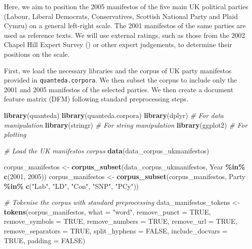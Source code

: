\documentclass[
]{book}
\newenvironment{Shaded}{\begin{snugshade}}{\end{snugshade}}
\newcommand{\AttributeTok}[1]{\textcolor[rgb]{0.13,0.29,0.53}{#1}}
\newcommand{\CommentTok}[1]{\textcolor[rgb]{0.56,0.35,0.01}{\textit{#1}}}
\newcommand{\ConstantTok}[1]{\textcolor[rgb]{0.56,0.35,0.01}{#1}}
\newcommand{\DecValTok}[1]{\textcolor[rgb]{0.00,0.00,0.81}{#1}}
\newcommand{\FunctionTok}[1]{\textcolor[rgb]{0.13,0.29,0.53}{\textbf{#1}}}
\newcommand{\NormalTok}[1]{#1}
\newcommand{\OtherTok}[1]{\textcolor[rgb]{0.56,0.35,0.01}{#1}}
\newcommand{\SpecialCharTok}[1]{\textcolor[rgb]{0.81,0.36,0.00}{\textbf{#1}}}
\newcommand{\StringTok}[1]{\textcolor[rgb]{0.31,0.60,0.02}{#1}}
\begin{document}
Here, we aim to position the 2005 manifestos of the five main UK political parties (Labour, Liberal Democrats, Conservatives, Scottish National Party and Plaid Cymru) on a general left-right scale. The 2001 manifestos of the same parties are used as reference texts. We will use external ratings, such as those from the 2002 Chapel Hill Expert Survey () or other expert judgements, to determine their positions on the scale.

First, we load the necessary libraries and the corpus of UK party manifestos provided in \texttt{quanteda.corpora}. We then subset the corpus to include only the 2001 and 2005 manifestos of the selected parties. We then create a document feature matrix (DFM) following standard preprocessing steps.

\begin{Shaded}
\begin{Highlighting}[]
\FunctionTok{library}\NormalTok{(quanteda)}
\FunctionTok{library}\NormalTok{(quanteda.corpora)}
\FunctionTok{library}\NormalTok{(dplyr)  }\CommentTok{\# For data manipulation}
\FunctionTok{library}\NormalTok{(stringr)  }\CommentTok{\# For string manipulation}
\FunctionTok{library}\NormalTok{(ggplot2)  }\CommentTok{\# For plotting}

\CommentTok{\# Load the UK manifestos corpus}
\FunctionTok{data}\NormalTok{(data\_corpus\_ukmanifestos)}

\NormalTok{corpus\_manifestos }\OtherTok{\textless{}{-}} \FunctionTok{corpus\_subset}\NormalTok{(data\_corpus\_ukmanifestos, Year }\SpecialCharTok{\%in\%} \FunctionTok{c}\NormalTok{(}\DecValTok{2001}\NormalTok{, }\DecValTok{2005}\NormalTok{))}
\NormalTok{corpus\_manifestos }\OtherTok{\textless{}{-}} \FunctionTok{corpus\_subset}\NormalTok{(corpus\_manifestos, Party }\SpecialCharTok{\%in\%} \FunctionTok{c}\NormalTok{(}\StringTok{"Lab"}\NormalTok{, }\StringTok{"LD"}\NormalTok{, }\StringTok{"Con"}\NormalTok{,}
    \StringTok{"SNP"}\NormalTok{, }\StringTok{"PCy"}\NormalTok{))}

\CommentTok{\# Tokenise the corpus with standard preprocessing}
\NormalTok{data\_manifestos\_tokens }\OtherTok{\textless{}{-}} \FunctionTok{tokens}\NormalTok{(corpus\_manifestos, }\AttributeTok{what =} \StringTok{"word"}\NormalTok{, }\AttributeTok{remove\_punct =} \ConstantTok{TRUE}\NormalTok{,}
    \AttributeTok{remove\_symbols =} \ConstantTok{TRUE}\NormalTok{, }\AttributeTok{remove\_numbers =} \ConstantTok{TRUE}\NormalTok{, }\AttributeTok{remove\_url =} \ConstantTok{TRUE}\NormalTok{, }\AttributeTok{remove\_separators =} \ConstantTok{TRUE}\NormalTok{,}
    \AttributeTok{split\_hyphens =} \ConstantTok{FALSE}\NormalTok{, }\AttributeTok{include\_docvars =} \ConstantTok{TRUE}\NormalTok{, }\AttributeTok{padding =} \ConstantTok{FALSE}\NormalTok{)}


\end{Highlighting}
\end{Shaded}
\end{document}

